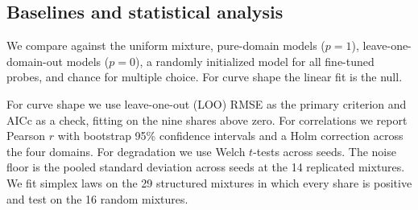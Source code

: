 \subsection{Baselines and statistical analysis}

We compare against the uniform mixture, pure-domain models ($p = 1$), leave-one-domain-out models ($p = 0$), a randomly initialized model for all fine-tuned probes, and chance for multiple choice.
For curve shape the linear fit is the null.

For curve shape we use leave-one-out (LOO) RMSE as the primary criterion and AICc as a check, fitting on the nine shares above zero.
For correlations we report Pearson $r$ with bootstrap 95\% confidence intervals and a Holm correction across the four domains.
For degradation we use Welch $t$-tests across seeds.
The noise floor is the pooled standard deviation across seeds at the 14 replicated mixtures.
We fit simplex laws on the 29 structured mixtures in which every share is positive and test on the 16 random mixtures.
